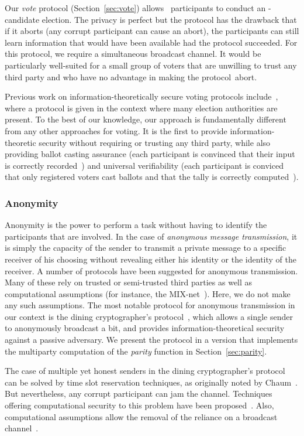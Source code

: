 \documentclass[11pt]{article}
\begin{document}
Our \emph{vote} protocol (Section~\ref{sec:vote}) allows~
participants to conduct an -candidate election. The privacy is
perfect but the protocol has the drawback that if it aborts (any
corrupt participant can cause an abort), the participants can still
learn information that would have been available had the protocol
succeeded.  For this protocol, we require a simultaneous broadcast
channel. It would be particularly well-suited for a small group of
voters that are unwilling to trust any third party and who have no
advantage in making the protocol~abort.

Previous work on information-theoretically secure voting protocols
include~\cite{CFSY96}, where a protocol is given in the context
where many election authorities are present. To the best of our
knowledge, our approach is fundamentally different from any other
approaches for  voting. It is the first to provide
information-theoretic security without requiring or trusting any
third party, while also providing ballot casting assurance (each
participant is convinced that their input is correctly
recorded~\cite{AN06}) and universal verifiability (each participant
is conviced that only registered voters cast ballots and that the
tally is correctly computed~\cite{SK95}).

\subsubsection{Anonymity}

Anonymity is the power to perform a task without having to identify
the participants that are involved.  In the case of \emph{anonymous
message transmission}, it is simply the capacity of the sender to
transmit a private message to a specific receiver of his choosing
without revealing either his identity or the identity of the
receiver. A number of protocols have been suggested for anonymous
transmission. Many of these rely on trusted or semi-trusted third
parties as well as computational assumptions (for instance, the
MIX-net~\cite{Chaum81}). Here, we do not make any such assumptions.
The most notable protocol for anonymous transmission in our context
is the dining cryptographer's protocol~\cite{Chaum88}, which allows
a single sender to anonymously broadcast a bit, and provides
information-theoretical security against a passive adversary. We
present the protocol in a version that implements the multiparty
computation of the \emph{parity} function in
Section~\ref{sec:parity}.


The case of multiple yet honest senders in the dining
cryptographer's protocol can be solved by time slot reservation
techniques, as originally noted by Chaum~\cite{Chaum88}. But
nevertheless, any corrupt participant can jam the channel.
Techniques offering computational security to this problem have been
proposed~\cite{Chaum88,WP89}. Also,  computational assumptions allow
the removal of the reliance on a broadcast channel~\cite{WP89Disco}.
\end{document}
